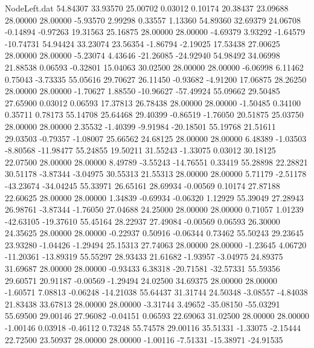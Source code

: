 \begin{filecontents}{NodeLeft.dat}
  54.84307   33.93570   25.00702     0.03012    0.10174   20.38437   23.09688   28.00000   28.00000   -5.93570    2.99298    0.33557    1.13360
  54.89360   32.69379   24.06708    -0.14894   -0.97263   19.31563   25.16875   28.00000   28.00000   -4.69379    3.93292   -1.64579  -10.74731
  54.94424   33.23074   23.56354    -1.86794   -2.19025   17.53438   27.00625   28.00000   28.00000   -5.23074    4.43646  -21.26085  -24.92940
  54.98492   34.06998   21.88538     0.06593   -0.32801   15.04063   30.02500   28.00000   28.00000   -6.06998    6.11462    0.75043   -3.73335
  55.05616   29.70627   26.11450    -0.93682   -4.91200   17.06875   28.26250   28.00000   28.00000   -1.70627    1.88550  -10.96627  -57.49924
  55.09662   29.50485   27.65900     0.03012    0.06593   17.37813   26.78438   28.00000   28.00000   -1.50485    0.34100    0.35711    0.78173
  55.14708   25.64468   29.40399    -0.86519   -1.76050   20.51875   25.03750   28.00000   28.00000    2.35532   -1.40399   -9.91984  -20.18501
  55.19768   21.51611   29.03503    -0.79357   -1.08007   25.66562   24.68125   28.00000   28.00000    6.48389   -1.03503   -8.80568  -11.98477
  55.24855   19.50211   31.55243    -1.33075    0.03012   30.18125   22.07500   28.00000   28.00000    8.49789   -3.55243  -14.76551    0.33419
  55.28898   22.28821   30.51178    -3.87344   -3.04975   30.55313   21.55313   28.00000   28.00000    5.71179   -2.51178  -43.23674  -34.04245
  55.33971   26.65161   28.69934    -0.00569    0.10174   27.87188   22.60625   28.00000   28.00000    1.34839   -0.69934   -0.06320    1.12929
  55.39049   27.28943   26.98761    -3.87344   -1.76050   27.04688   24.25000   28.00000   28.00000    0.71057    1.01239  -42.63105  -19.37610
  55.45164   28.22937   27.49084    -0.00569    0.06593   26.30000   24.35625   28.00000   28.00000   -0.22937    0.50916   -0.06344    0.73462
  55.50243   29.23645   23.93280    -1.04426   -1.29494   25.15313   27.74063   28.00000   28.00000   -1.23645    4.06720  -11.20361  -13.89319
  55.55297   28.93433   21.61682    -1.93957   -3.04975   24.89375   31.69687   28.00000   28.00000   -0.93433    6.38318  -20.71581  -32.57331
  55.59356   29.60571   20.91187    -0.00569   -1.29494   24.02500   34.69375   28.00000   28.00000   -1.60571    7.08813   -0.06248  -14.21038
  55.64437   31.31744   24.50348    -3.08557   -4.84038   21.83438   33.67813   28.00000   28.00000   -3.31744    3.49652  -35.08150  -55.03291
  55.69500   29.00146   27.96082    -0.04151    0.06593   22.69063   31.02500   28.00000   28.00000   -1.00146    0.03918   -0.46112    0.73248
  55.74578   29.00116   35.51331    -1.33075   -2.15444   22.72500   23.50937   28.00000   28.00000   -1.00116   -7.51331  -15.38971  -24.91535

\end{filecontents}
